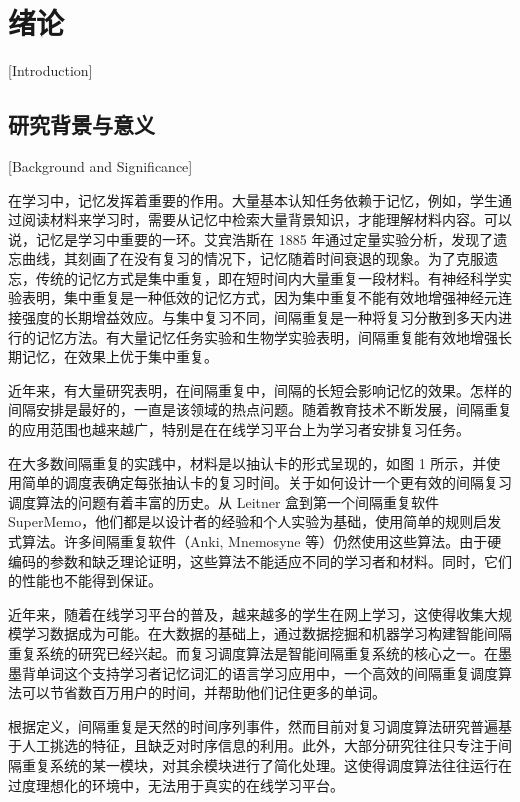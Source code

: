 
\chapter{绪论}[Introduction]

\section{研究背景与意义}[Background and Significance]

在学习中，记忆发挥着重要的作用。大量基本认知任务依赖于记忆，例如，学生通过阅读材料来学习时，需要从记忆中检索大量背景知识，才能理解材料内容。可以说，记忆是学习中重要的一环。艾宾浩斯在 1885 年通过定量实验分析，发现了遗忘曲线，其刻画了在没有复习的情况下，记忆随着时间衰退的现象。为了克服遗忘，传统的记忆方式是集中重复，即在短时间内大量重复一段材料。有神经科学实验表明，集中重复是一种低效的记忆方式，因为集中重复不能有效地增强神经元连接强度的长期增益效应。与集中复习不同，间隔重复是一种将复习分散到多天内进行的记忆方法。有大量记忆任务实验和生物学实验表明，间隔重复能有效地增强长期记忆，在效果上优于集中重复。

近年来，有大量研究表明，在间隔重复中，间隔的长短会影响记忆的效果。怎样的间隔安排是最好的，一直是该领域的热点问题。随着教育技术不断发展，间隔重复的应用范围也越来越广，特别是在在线学习平台上为学习者安排复习任务。

在大多数间隔重复的实践中，材料是以抽认卡的形式呈现的，如图 1 所示，并使用简单的调度表确定每张抽认卡的复习时间。关于如何设计一个更有效的间隔复习调度算法的问题有着丰富的历史。从 Leitner 盒到第一个间隔重复软件 SuperMemo，他们都是以设计者的经验和个人实验为基础，使用简单的规则启发式算法。许多间隔重复软件（Anki, Mnemosyne 等）仍然使用这些算法。由于硬编码的参数和缺乏理论证明，这些算法不能适应不同的学习者和材料。同时，它们的性能也不能得到保证。

近年来，随着在线学习平台的普及，越来越多的学生在网上学习，这使得收集大规模学习数据成为可能。在大数据的基础上，通过数据挖掘和机器学习构建智能间隔重复系统的研究已经兴起。而复习调度算法是智能间隔重复系统的核心之一。在墨墨背单词这个支持学习者记忆词汇的语言学习应用中，一个高效的间隔重复调度算法可以节省数百万用户的时间，并帮助他们记住更多的单词。

根据定义，间隔重复是天然的时间序列事件，然而目前对复习调度算法研究普遍基于人工挑选的特征，且缺乏对时序信息的利用。此外，大部分研究往往只专注于间隔重复系统的某一模块，对其余模块进行了简化处理。这使得调度算法往往运行在过度理想化的环境中，无法用于真实的在线学习平台。


